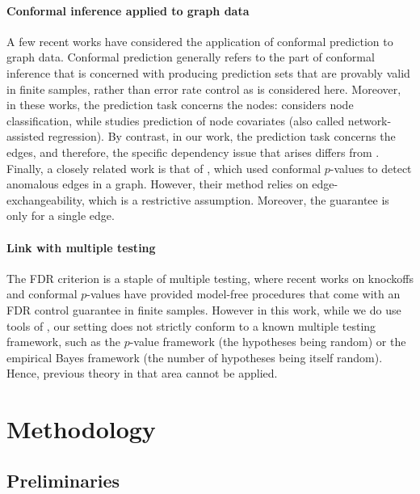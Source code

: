 \documentclass[a4paper, 11pt]{article}
\theoremstyle{remark}
\begin{document}
 \paragraph{Conformal inference applied to graph data} A few recent works \citep{huang2023uncertainty, lunde2023conformal} have considered the application of conformal prediction \citep{angelopoulos2021gentle} to graph data. Conformal prediction generally refers to the part of conformal inference that is concerned with producing prediction sets that are provably valid in finite samples, rather than error rate control as is considered here. Moreover, in these works, the prediction task concerns the nodes: \cite{huang2023uncertainty} considers node classification, while \cite{lunde2023conformal} studies prediction of node covariates (also called network-assisted regression). By contrast, in our work, the prediction task concerns the edges, and therefore, the specific dependency issue that arises differs from \cite{huang2023uncertainty, lunde2023conformal}. 
 Finally, a closely related work is that of \cite{luo2021anomalous}, which used conformal $p$-values to detect anomalous edges in a graph. However, their method relies on edge-exchangeability, which is a restrictive assumption. Moreover, the guarantee is only for a single edge. 

\paragraph{Link with multiple testing} The FDR criterion is a staple of multiple testing, 
where recent works on knockoffs and conformal $p$-values \citep{barber15, weinstein2017power, bates2023testing, yang2021bonus, marandon22b} have provided model-free procedures that come with an FDR control guarantee in finite samples. However in this work, while we do use tools of \cite{weinstein2017power, bates2023testing}, our setting does not strictly conform to a known multiple testing framework, such as the $p$-value framework \citep{BH1995} (the hypotheses being random) or the empirical Bayes framework \citep{efron01, sun07} (the number of hypotheses being itself random). Hence, previous theory in that area cannot be applied. 



\section{Methodology} \label{lp:sec:meth}

\subsection{Preliminaries} \label{lp:sec:meth:not}
\end{document}
